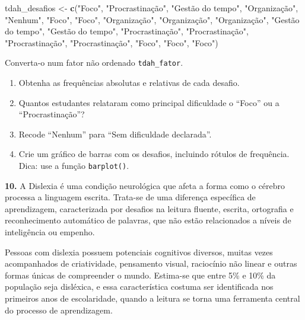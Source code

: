 \documentclass[
]{book}
\newenvironment{Shaded}{\begin{snugshade}}{\end{snugshade}}
\newcommand{\FunctionTok}[1]{\textcolor[rgb]{0.13,0.29,0.53}{\textbf{#1}}}
\newcommand{\NormalTok}[1]{#1}
\newcommand{\OtherTok}[1]{\textcolor[rgb]{0.56,0.35,0.01}{#1}}
\newcommand{\StringTok}[1]{\textcolor[rgb]{0.31,0.60,0.02}{#1}}
\begin{document}
\begin{Shaded}
\begin{Highlighting}[]
\NormalTok{tdah\_desafios }\OtherTok{\textless{}{-}} \FunctionTok{c}\NormalTok{(}\StringTok{"Foco"}\NormalTok{, }\StringTok{"Procrastinação"}\NormalTok{, }\StringTok{"Gestão do tempo"}\NormalTok{, }\StringTok{"Organização"}\NormalTok{, }\StringTok{"Nenhum"}\NormalTok{, }\StringTok{"Foco"}\NormalTok{, }\StringTok{"Foco"}\NormalTok{, }\StringTok{"Organização"}\NormalTok{, }\StringTok{"Organização"}\NormalTok{, }\StringTok{"Organização"}\NormalTok{, }\StringTok{"Gestão do tempo"}\NormalTok{, }\StringTok{"Gestão do tempo"}\NormalTok{, }\StringTok{"Procrastinação"}\NormalTok{, }\StringTok{"Procrastinação"}\NormalTok{, }\StringTok{"Procrastinação"}\NormalTok{, }\StringTok{"Procrastinação"}\NormalTok{, }\StringTok{"Foco"}\NormalTok{, }\StringTok{"Foco"}\NormalTok{, }\StringTok{"Foco"}\NormalTok{)}
\end{Highlighting}
\end{Shaded}

Converta-o num fator não ordenado \texttt{tdah\_fator}.

\begin{enumerate}
\def\labelenumi{(\alph{enumi})}
\setcounter{enumi}{1}
\item
  Obtenha as frequências absolutas e relativas de cada desafio.
\item
  Quantos estudantes relataram como principal dificuldade o ``Foco'' ou a ``Procrastinação''?
\item
  Recode ``Nenhum'' para ``Sem dificuldade declarada''.
\item
  Crie um gráfico de barras com os desafios, incluindo rótulos de frequência. Dica: use a função \texttt{barplot()}.
\end{enumerate}

\textbf{10.} A Dislexia é uma condição neurológica que afeta a forma como o cérebro processa a linguagem escrita. Trata-se de uma diferença específica de aprendizagem, caracterizada por desafios na leitura fluente, escrita, ortografia e reconhecimento automático de palavras, que não estão relacionados a níveis de inteligência ou empenho.

Pessoas com dislexia possuem potenciais cognitivos diversos, muitas vezes acompanhados de criatividade, pensamento visual, raciocínio não linear e outras formas únicas de compreender o mundo. Estima-se que entre 5\% e 10\% da população seja disléxica, e essa característica costuma ser identificada nos primeiros anos de escolaridade, quando a leitura se torna uma ferramenta central do processo de aprendizagem.
\end{document}
